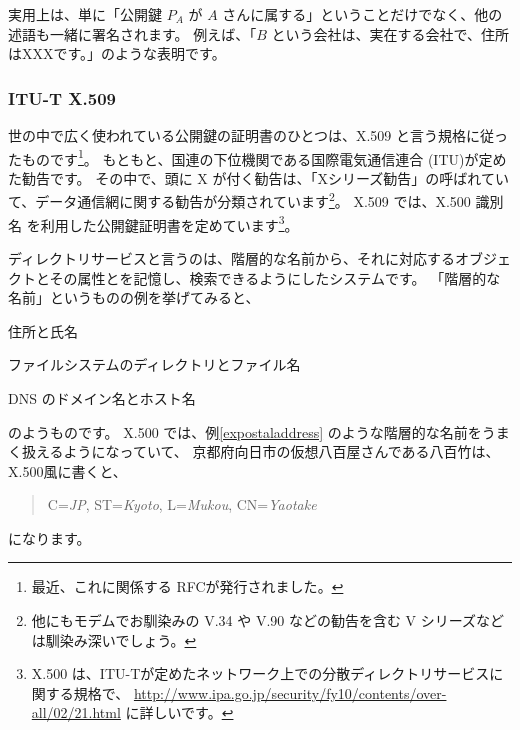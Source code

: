 \documentclass[mingoth,a4paper]{jsarticle}
\begin{document}
実用上は、単に「公開鍵 $P_A$ が $A$ さんに属する」ということだけでなく、他の述語も一緒に署名されます。
例えば、「$B$ という会社は、実在する会社で、住所はXXXです。」のような表明です。


\subsubsection{ITU-T X.509}
世の中で広く使われている公開鍵の証明書のひとつは、X.509 と言う規格に従ったものです\footnote{最近、これに関係する RFCが発行されました\cite{RFC5280}。}。
もともと、国連の下位機関である国際電気通信連合 (ITU)が定めた勧告です。
その中で、頭に X が付く勧告は、「Xシリーズ勧告」の呼ばれていて、データ通信網に関する勧告が分類されています\footnote{他にもモデムでお馴染みの V.34 や V.90 などの勧告を含む V シリーズなどは馴染み深いでしょう。}。
X.509 では、X.500 識別名 を利用した公開鍵証明書を定めています\footnote{
X.500 は、ITU-Tが定めたネットワーク上での分散ディレクトリサービスに関する規格で、
\url{http://www.ipa.go.jp/security/fy10/contents/over-all/02/21.html} に詳しいです。}。

ディレクトリサービスと言うのは、階層的な名前から、それに対応するオブジェクトとその属性とを記憶し、検索できるようにしたシステムです。
「階層的な名前」というものの例を挙げてみると、
\begin{list}{例: }{\protect{}}
\item 住所と氏名\label{expostaladdress}
\item ファイルシステムのディレクトリとファイル名
\item DNS のドメイン名とホスト名
\end{list}
のようものです。
X.500 では、例\ref{expostaladdress} のような階層的な名前をうまく扱えるようになっていて、
京都府向日市の仮想八百屋さんである八百竹は、X.500風に書くと、
\begin{quote}
C={\em JP}, ST={\em Kyoto}, L={\em Mukou}, CN={\em Yaotake}
\end{quote}
になります。
\end{document}
